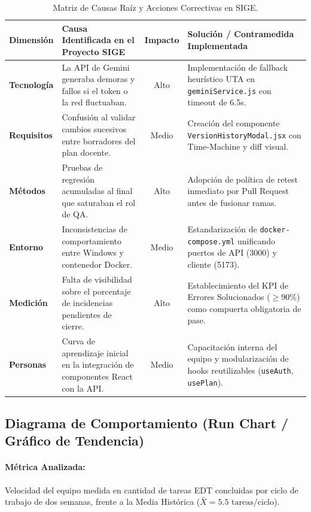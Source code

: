 \documentclass[12pt,a4paper]{article}
\begin{document}
\begin{table}[H]
\centering
\small
\renewcommand{\arraystretch}{1.2}
\begin{tabularx}{\textwidth}{|>{\bfseries}p{2.8cm}|X|c|X|}
\hline
\rowcolor{tableheader}
Dimensión & Causa Identificada en el Proyecto SIGE & Impacto & Solución / Contramedida Implementada \\ \hline
Tecnología & La API de Gemini generaba demoras y fallos si el token o la red fluctuaban. & Alto & Implementación de fallback heurístico UTA en \texttt{geminiService.js} con timeout de 6.5s. \\ \hline
Requisitos & Confusión al validar cambios sucesivos entre borradores del plan docente. & Medio & Creación del componente \texttt{VersionHistoryModal.jsx} con Time-Machine y diff visual. \\ \hline
Métodos & Pruebas de regresión acumuladas al final que saturaban el rol de QA. & Alto & Adopción de política de retest inmediato por Pull Request antes de fusionar ramas. \\ \hline
Entorno & Inconsistencias de comportamiento entre Windows y contenedor Docker. & Medio & Estandarización de \texttt{docker-compose.yml} unificando puertos de API (3000) y cliente (5173). \\ \hline
Medición & Falta de visibilidad sobre el porcentaje de incidencias pendientes de cierre. & Alto & Establecimiento del KPI de Errores Solucionados ($\ge 90\%$) como compuerta obligatoria de pase. \\ \hline
Personas & Curva de aprendizaje inicial en la integración de componentes React con la API. & Medio & Capacitación interna del equipo y modularización de hooks reutilizables (\texttt{useAuth}, \texttt{usePlan}). \\ \hline
\end{tabularx}
\caption{Matriz de Causas Raíz y Acciones Correctivas en SIGE.}
\label{tab:matriz_ishikawa}
\end{table}

\subsection{Diagrama de Comportamiento (Run Chart / Gráfico de Tendencia)}

\paragraph{Métrica Analizada:}
Velocidad del equipo medida en cantidad de tareas EDT concluidas por ciclo de trabajo de dos semanas, frente a la Media Histórica ($\bar{X} = 5.5\text{ tareas/ciclo}$).
\end{document}
